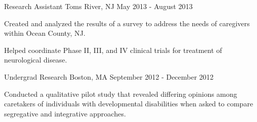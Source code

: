 \begin{cventries}
    {Research Assistant}
    {Toms River, NJ}
    {May 2013 - August 2013}
    {\begin{cvitems}
        \item{Created and analyzed the results of a 
            {survey} to address the needs of caregivers within Ocean County,
            NJ.\vspace*{0.1cm}}
        \item{Helped coordinate Phase II, III, and IV clinical trials for treatment of
            neurological disease.}
    \end{cvitems}}
    \vspace*{0.2cm}
    
    {Undergrad Research}
    {Boston, MA}
    {September 2012 - December 2012}
    {\begin{cvitems}
        \item{Conducted a qualitative 
            {pilot study} that revealed differing opinions among caretakers of
            individuals with developmental disabilities when asked to compare
            segregative and integrative approaches.}
    \end{cvitems}}

\vspace*{-0.2cm}
\end{cventries}
